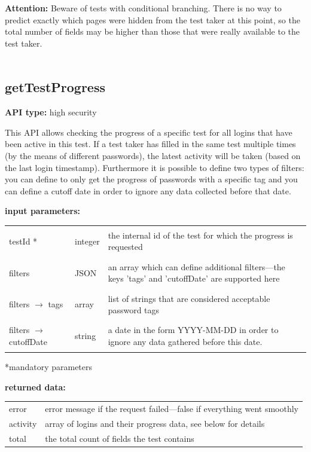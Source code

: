 \documentclass[12pt]{article} %
\newenvironment{keyword}{\leavevmode\color{magenta}}{}
\newenvironment{properties}
{
    \footnotesize\renewcommand{\arraystretch}{1.30}
    \renewcommand{\tabcolsep}{0pt}
    \begin{longtable}{>{\begin{keyword}}p{3.1cm}<{\end{keyword}}p{13.9cm}}
        \hline
        }
        {
        \hline
    \end{longtable}\vspace{5mm}
}
\newenvironment{parameters}
{
    \footnotesize\renewcommand{\arraystretch}{1.30}
    \renewcommand{\tabcolsep}{0pt}
    \begin{longtable}{>{\begin{keyword}}p{3cm}<{\end{keyword}}>{\begin{em}}p{1.5cm}<{\end{em}}p{12.5cm}}
        \hline
        }
        {
        \hline
    \end{longtable}\scriptsize\vspace{-5mm}*mandatory parameters\vspace{5mm}
}
\begin{document}
    \textbf{Attention:} Beware of tests with conditional branching.
    There is no way to predict exactly which pages were hidden from the test taker at this point, so the total number of fields may be higher than those that were really available to the test taker. \\\\

    \subsection{getTestProgress}\label{subsec:gettestprogress}

    \textbf{API type:} high security

    This API allows checking the progress of a specific test for all logins that have been active in this test.
    If a test taker has filled in the same test multiple times (by the means of different passwords), the latest activity will be taken (based on the last login timestamp).
    Furthermore it is possible to define two types of filters: you can define to only get the progress of passwords with a specific tag and you can define a cutoff date in order to ignore any data collected before that date.

    \begin{minipage}{\textwidth}
        \textbf{input parameters:}
        \begin{parameters}
            testId *                         & integer & the internal id of the test for which the progress is requested                                  \\
            filters                          & JSON    & an array which can define additional filters—the keys 'tags' and 'cutoffDate' are supported here \\
            filters $\rightarrow$ tags       & array   & list of strings that are considered acceptable password tags                                     \\
            filters $\rightarrow$ cutoffDate & string  & a date in the form YYYY-MM-DD in order to ignore any data gathered before this date.             \\
        \end{parameters}
    \end{minipage}

    \begin{minipage}{\textwidth}
        \textbf{returned data:}
        \begin{properties}
            error    & error message if the request failed—false if everything went smoothly \\
            activity & array of logins and their progress data, see below for details        \\
            total    & the total count of fields the test contains                           \\
        \end{properties}
    \end{minipage}
\end{document}
